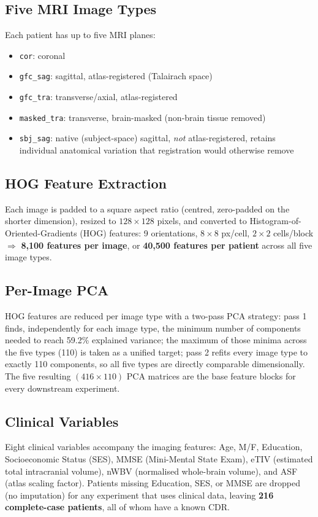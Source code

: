 \documentclass[11pt, a4paper]{article}
\begin{document}
\subsection{Five MRI Image Types}
Each patient has up to five MRI planes:
\begin{itemize}[noitemsep]
    \item \texttt{cor}: coronal
    \item \texttt{gfc\_sag}: sagittal, atlas-registered (Talairach space)
    \item \texttt{gfc\_tra}: transverse/axial, atlas-registered
    \item \texttt{masked\_tra}: transverse, brain-masked (non-brain tissue removed)
    \item \texttt{sbj\_sag}: native (subject-space) sagittal, \emph{not} atlas-registered, retains
    individual anatomical variation that registration would otherwise remove
\end{itemize}

\subsection{HOG Feature Extraction}
Each image is padded to a square aspect ratio (centred, zero-padded on the shorter dimension),
resized to $128\times128$ pixels, and converted to Histogram-of-Oriented-Gradients (HOG) features:
9 orientations, $8\times8$ px/cell, $2\times2$ cells/block $\Rightarrow$ \textbf{8{,}100 features per
image}, or \textbf{40{,}500 features per patient} across all five image types.

\subsection{Per-Image PCA}
HOG features are reduced per image type with a two-pass PCA strategy: pass 1 finds, independently
for each image type, the minimum number of components needed to reach 59.2\% explained variance;
the maximum of those minima across the five types (110) is taken as a unified target; pass 2 refits
every image type to exactly 110 components, so all five types are directly comparable
dimensionally. The five resulting $(416\times110)$ PCA matrices are the base feature blocks for
every downstream experiment.

\subsection{Clinical Variables}
Eight clinical variables accompany the imaging features: Age, M/F, Education, Socioeconomic Status
(SES), MMSE (Mini-Mental State Exam), eTIV (estimated total intracranial volume), nWBV (normalised
whole-brain volume), and ASF (atlas scaling factor). Patients missing Education, SES, or MMSE are
dropped (no imputation) for any experiment that uses clinical data, leaving \textbf{216 complete-case
patients}, all of whom have a known CDR.
\end{document}
